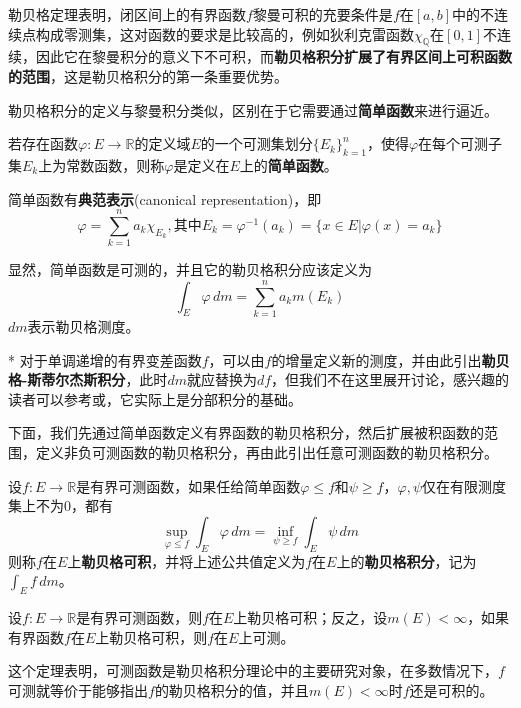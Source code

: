 \documentclass{ctexbook}
\begin{document}
勒贝格定理\cite{real_analysis}表明，闭区间上的有界函数$f$黎曼可积的充要条件是$f$在$[a,b]$中的不连续点构成零测集，这对函数的要求是比较高的，例如狄利克雷函数$\chi_{\mathbb{Q}}$在$[0,1]$不连续，因此它在黎曼积分的意义下不可积，而\textbf{勒贝格积分扩展了有界区间上可积函数的范围}，这是勒贝格积分的第一条重要优势。

勒贝格积分的定义与黎曼积分类似，区别在于它需要通过\textbf{简单函数}来进行逼近。

\begin{definition}[简单函数]
    若存在函数$\varphi:E\to\mathbb{R}$的定义域$E$的一个可测集划分$\{E_k\}_{k=1}^{n}$，使得$\varphi$在每个可测子集$E_k$上为常数函数，则称$\varphi$是定义在$E$上的\textbf{简单函数}。

    简单函数有\textbf{典范表示}(canonical representation)，即
    \[\varphi=\sum_{k=1}^{n}a_k\chi_{E_k},\text{其中}E_k=\varphi^{-1}(a_k)=\{x\in E|\varphi(x)=a_k\}\]
\end{definition}

显然，简单函数是可测的，并且它的勒贝格积分应该定义为
\[\int_{E}\varphi\,dm=\sum_{k=1}^{n}a_k m(E_k)\]
$dm$表示勒贝格测度。
\begin{remark}*
    对于单调递增的有界变差函数$f$，可以由$f$的增量定义新的测度，并由此引出\textbf{勒贝格-斯蒂尔杰斯积分}，此时$dm$就应替换为$df$，但我们不在这里展开讨论，感兴趣的读者可以参考\cite{simple_real_analysis}或\cite{chentianquan}，它实际上是分部积分的基础。
\end{remark}

下面，我们先通过简单函数定义有界函数的勒贝格积分，然后扩展被积函数的范围，定义非负可测函数的勒贝格积分，再由此引出任意可测函数的勒贝格积分。

\begin{definition}[有界函数的勒贝格积分]
    设$f:E\to\mathbb{R}$是有界可测函数，如果任给简单函数$\varphi\leq f$和$\psi\geq f$，$\varphi,\psi$仅在有限测度集上不为0，都有
    \[\sup_{\varphi\leq f}\int_{E}\varphi\,dm=\inf_{\psi\geq f}\int_{E}\psi\,dm\]
    则称$f$在$E$上\textbf{勒贝格可积}，并将上述公共值定义为$f$在$E$上的\textbf{勒贝格积分}，记为$\int_{E}f\,dm$。
\end{definition}

\begin{theorem}
    设$f:E\to\mathbb{R}$是有界可测函数，则$f$在$E$上勒贝格可积；反之，设$m(E)<\infty$，如果有界函数$f$在$E$上勒贝格可积，则$f$在$E$上可测。
\end{theorem}

这个定理表明，可测函数是勒贝格积分理论中的主要研究对象，在多数情况下，$f$可测就等价于能够指出$f$的勒贝格积分的值，并且$m(E)<\infty$时$f$还是可积的。
\end{document}
